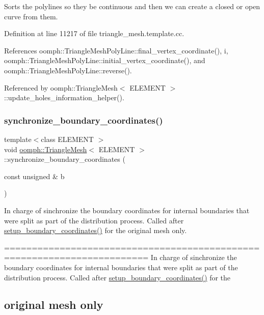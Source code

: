 Sorts the polylines so they be continuous and then we can create a closed or open curve from them. 



Definition at line 11217 of file triangle\+\_\+mesh.\+template.\+cc.



References oomph\+::\+Triangle\+Mesh\+Poly\+Line\+::final\+\_\+vertex\+\_\+coordinate(), i, oomph\+::\+Triangle\+Mesh\+Poly\+Line\+::initial\+\_\+vertex\+\_\+coordinate(), and oomph\+::\+Triangle\+Mesh\+Poly\+Line\+::reverse().



Referenced by oomph\+::\+Triangle\+Mesh$<$ E\+L\+E\+M\+E\+N\+T $>$\+::update\+\_\+holes\+\_\+information\+\_\+helper().

\mbox{\label{classoomph_1_1TriangleMesh_a4068378c7e25cc672e4f3c750f4957bc}} 
\subsubsection{\texorpdfstring{synchronize\+\_\+boundary\+\_\+coordinates()}{synchronize\_boundary\_coordinates()}}
{\footnotesize\ttfamily template$<$class E\+L\+E\+M\+E\+NT $>$ \\
void \hyperlink{classoomph_1_1TriangleMesh}{oomph\+::\+Triangle\+Mesh}$<$ E\+L\+E\+M\+E\+NT $>$\+::synchronize\+\_\+boundary\+\_\+coordinates (\begin{DoxyParamCaption}\item[{const unsigned \&}]{b }\end{DoxyParamCaption})}



In charge of sinchronize the boundary coordinates for internal boundaries that were split as part of the distribution process. Called after \hyperlink{classoomph_1_1UnstructuredTwoDMeshGeometryBase_a9edf47b5d621689f7c1d376b9c057ede}{setup\+\_\+boundary\+\_\+coordinates()} for the original mesh only. 

======================================================================== In charge of sinchronize the boundary coordinates for internal boundaries that were split as part of the distribution process. Called after \hyperlink{classoomph_1_1UnstructuredTwoDMeshGeometryBase_a9edf47b5d621689f7c1d376b9c057ede}{setup\+\_\+boundary\+\_\+coordinates()} for the \subsection*{original mesh only }


